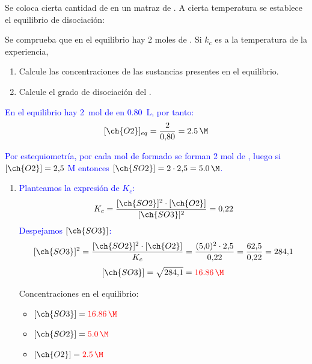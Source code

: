\begin{exerciseEVAU}
    Se coloca cierta cantidad de  en un matraz de .
    A cierta temperatura se establece el equilibrio de disociación:
    \begin{center}
    \end{center}
    Se comprueba que en el equilibrio hay 2 moles de .
    Si \(k_c\) es  a la temperatura de la experiencia,
    \begin{enumerate}[label=\letraminuscula]
        \item Calcule las concentraciones de las sustancias presentes en el equilibrio.
        \item Calcule el grado de disociación del .
    \end{enumerate}
    \begin{solu}

    \textcolor{blue}{En el equilibrio hay \qty{2}{\mol} de  en \qty{0.80}{\L}, por tanto:}
    \[
        [\ch{O2}]_{eq} = \frac{2}{0{,}80} = \qty{2{,}5}{\M}
    \]

    \textcolor{blue}{Por estequiometría, por cada mol de  formado se forman 2 mol de , luego si \([\ch{O2}] = 2{,}5\) M entonces \([\ch{SO2}] = 2\cdot2{,}5 = \qty{5{,}0}{\M}\).}

    \begin{enumerate}[label=\letraminuscula]
        \item \textcolor{blue}{Planteamos la expresión de \(K_c\):}
        \[
            K_c = \frac{[\ch{SO2}]^2\cdot[\ch{O2}]}{[\ch{SO3}]^2} = 0{,}22
        \]
        \textcolor{blue}{Despejamos \([\ch{SO3}]\):}
        \[
            [\ch{SO3}]^2 = \frac{[\ch{SO2}]^2\cdot[\ch{O2}]}{K_c} = \frac{(5{,}0)^2\cdot 2{,}5}{0{,}22} = \frac{62{,}5}{0{,}22} = 284{,}1
        \]
        \[
            [\ch{SO3}] = \sqrt{284{,}1} = \textcolor{red}{\qty{16{,}86}{\M}}
        \]

        Concentraciones en el equilibrio:
        \begin{itemize}
            \item \([\ch{SO3}] = \textcolor{red}{\qty{16{,}86}{\M}}\)
            \item \([\ch{SO2}] = \textcolor{red}{\qty{5{,}0}{\M}}\)
            \item \([\ch{O2}] = \textcolor{red}{\qty{2{,}5}{\M}}\)
        \end{itemize}


\end{enumerate}
\end{solu}
\end{exerciseEVAU}
